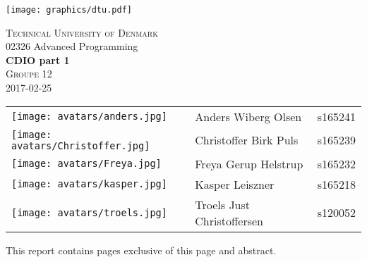 \begin{titlepage}

\begin{center}
    \texttt{[image: graphics/dtu.pdf]}\par\vspace{1cm}

    {\scshape\LARGE Technical University of Denmark\\}
	\vspace{0.5cm}
    02326 Advanced Programming\\
	\vspace{0.8cm}
	{\huge\bfseries CDIO part 1\\}
	{\scshape\Large Groupe 12\\}
	{\Large 2017-02-25\\}
	
	\vfill

    \begin{tabular}{m{1in} >{\centering\arraybackslash}m{2in} >{\centering\arraybackslash}m{1in}}
        \texttt{[image: avatars/anders.jpg]} & Anders Wiberg Olsen & s165241\\
        \texttt{[image: avatars/Christoffer.jpg]} & Christoffer Birk Puls & s165239\\
        \texttt{[image: avatars/Freya.jpg]} & Freya Gerup Helstrup & s165232\\
        \texttt{[image: avatars/kasper.jpg]} & Kasper Leiszner & s165218\\
        \texttt{[image: avatars/troels.jpg]} & Troels Just Christoffersen & s120052   \\
    \end{tabular}
    
	\vspace{0.5cm}

	This report contains \pageref{LastPage} pages exclusive of this page and abstract.
\end{center}

\end{titlepage}
